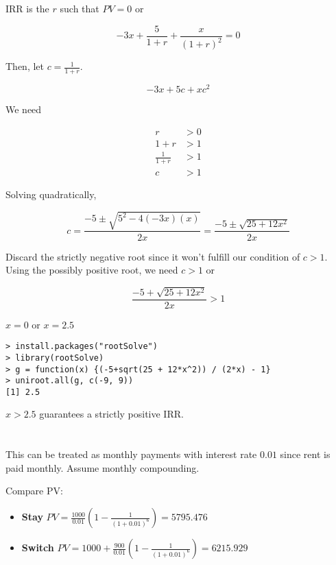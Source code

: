 \documentclass[11pt]{scrartcl}
\begin{document}
\subsection{}

IRR is the $r$ such that $PV = 0$ or

\[-3x + \frac{5}{1+r} + \frac{x}{(1+r)^2} = 0\]

Then, let $c = \frac{1}{1+r}$. 

\[-3x + 5c + xc^2\]

We need

\begin{align*}
r &> 0 \\
1 + r &> 1 \\
\frac{1}{1+r} &> 1 \\
c &> 1
\end{align*}

Solving quadratically,

\[c = \frac{-5 \pm\sqrt{5^2 - 4(-3x)(x)}}{2x} = \frac{-5 \pm\sqrt{25 + 12x^2}}{2x}\]

Discard the strictly negative root since it won't fulfill our condition of $c > 1$. Using the possibly positive root, we need $c>1$ or

\[\frac{-5 + \sqrt{25 + 12x^2}}{2x} > 1\]

$x = 0$ or $x = 2.5$

\begin{lstlisting}
> install.packages("rootSolve")
> library(rootSolve)
> g = function(x) {(-5+sqrt(25 + 12*x^2)) / (2*x) - 1}
> uniroot.all(g, c(-9, 9))
[1] 2.5
\end{lstlisting}

$x > 2.5$ guarantees a strictly positive IRR.

\section{}

This can be treated as monthly payments with interest rate $0.01$ since rent is paid monthly. Assume monthly compounding.

Compare PV:

\begin{itemize}
\item \textbf{Stay} $PV = \frac{1000}{0.01} \left(1 - \frac{1}{(1+0.01)^6}\right) = 5795.476$
\item \textbf{Switch} $PV = 1000 + \frac{900}{0.01} \left(1 - \frac{1}{(1+0.01)^6} \right) = 6215.929$
\end{itemize}
\end{document}
